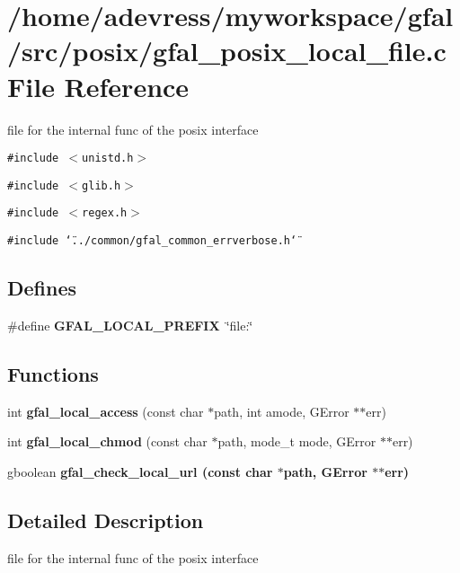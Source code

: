 \section{/home/adevress/myworkspace/gfal/src/posix/gfal\_\-posix\_\-local\_\-file.c File Reference}
\label{gfal__posix__local__file_8c}
file for the internal func of the posix interface 

{\tt \#include $<$unistd.h$>$}\par
{\tt \#include $<$glib.h$>$}\par
{\tt \#include $<$regex.h$>$}\par
{\tt \#include \char`\"{}../common/gfal\_\-common\_\-errverbose.h\char`\"{}}\par
\subsection*{Defines}
\begin{CompactItemize}
\item 
\#define \textbf{GFAL\_\-LOCAL\_\-PREFIX}~\char`\"{}file:\char`\"{}\label{gfal__posix__local__file_8c_72e3f23638773071a6db4d9a354ccfdb}

\end{CompactItemize}
\subsection*{Functions}
\begin{CompactItemize}
\item 
int \textbf{gfal\_\-local\_\-access} (const char $\ast$path, int amode, GError $\ast$$\ast$err)\label{gfal__posix__local__file_8c_a98ca73fb3083a78f5d85b1f298a8b97}

\item 
int \textbf{gfal\_\-local\_\-chmod} (const char $\ast$path, mode\_\-t mode, GError $\ast$$\ast$err)\label{gfal__posix__local__file_8c_d6c6d5590083bbcef4833f8186a629f3}

\item 
gboolean \bf{gfal\_\-check\_\-local\_\-url} (const char $\ast$path, GError $\ast$$\ast$err)
\end{CompactItemize}


\subsection{Detailed Description}
file for the internal func of the posix interface 

